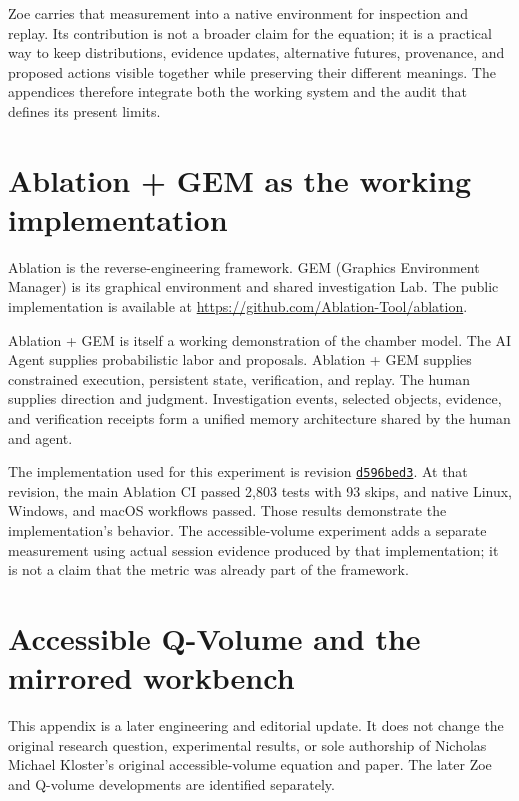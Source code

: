 \documentclass[11pt,a4paper]{article}
\begin{document}
Zoe carries that measurement into a native environment for inspection and replay. Its contribution is not a broader claim for the equation; it is a practical way to keep distributions, evidence updates, alternative futures, provenance, and proposed actions visible together while preserving their different meanings. The appendices therefore integrate both the working system and the audit that defines its present limits.

\appendix

\section{Ablation + GEM as the working implementation}
Ablation is the reverse-engineering framework. GEM (Graphics Environment Manager) is its graphical environment and shared investigation Lab. The public implementation is available at \url{https://github.com/Ablation-Tool/ablation}.

Ablation + GEM is itself a working demonstration of the chamber model. The AI Agent supplies probabilistic labor and proposals. Ablation + GEM supplies constrained execution, persistent state, verification, and replay. The human supplies direction and judgment. Investigation events, selected objects, evidence, and verification receipts form a unified memory architecture shared by the human and agent.

The implementation used for this experiment is revision \href{https://github.com/Ablation-Tool/ablation/commit/d596bed31ba5fe361efa1c6fdad6d86e3126ab63}{\texttt{d596bed3}}. At that revision, the main Ablation CI passed 2,803 tests with 93 skips, and native Linux, Windows, and macOS workflows passed. Those results demonstrate the implementation's behavior. The accessible-volume experiment adds a separate measurement using actual session evidence produced by that implementation; it is not a claim that the metric was already part of the framework.

\section{Accessible Q-Volume and the mirrored workbench}
This appendix is a later engineering and editorial update. It does not change the original research question, experimental results, or sole authorship of Nicholas Michael Kloster's original accessible-volume equation and paper. The later Zoe and Q-volume developments are identified separately.
\end{document}
